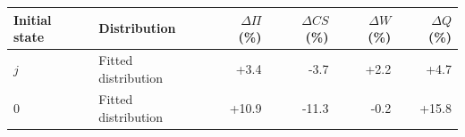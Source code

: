\begin{tabular}{llrrrr}\toprule
Initial state & Distribution & $\Delta\Pi$ (\%) & $\Delta CS$ (\%) & $\Delta W$ (\%) & $\Delta Q$ (\%)\\\midrule
$j$ & Fitted distribution & +3.4 & -3.7 & +2.2 & +4.7 \\
$0$ & Fitted distribution & +10.9 & -11.3 & -0.2 & +15.8 \\
\bottomrule\end{tabular}

